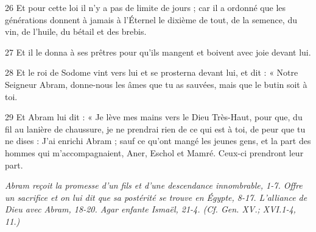 \par 26 Et pour cette loi il n'y a pas de limite de jours ; car il a ordonné que les générations donnent à jamais à l'Éternel le dixième de tout, de la semence, du vin, de l'huile, du bétail et des brebis.
\par 27 Et il le donna à ses prêtres pour qu'ils mangent et boivent avec joie devant lui.
\par 28 Et le roi de Sodome vint vers lui et se prosterna devant lui, et dit : « Notre Seigneur Abram, donne-nous les âmes que tu as sauvées, mais que le butin soit à toi.
\par 29 Et Abram lui dit : « Je lève mes mains vers le Dieu Très-Haut, pour que, du fil au lanière de chaussure, je ne prendrai rien de ce qui est à toi, de peur que tu ne dises : J'ai enrichi Abram ; sauf ce qu'ont mangé les jeunes gens, et la part des hommes qui m'accompagnaient, Aner, Eschol et Mamré. Ceux-ci prendront leur part.


\par \textit{Abram reçoit la promesse d'un fils et d'une descendance innombrable, 1-7. Offre un sacrifice et on lui dit que sa postérité se trouve en Égypte, 8-17. L'alliance de Dieu avec Abram, 18-20. Agar enfante Ismaël, 21-4. (Cf. Gen. XV.; XVI.1-4, 11.)}


